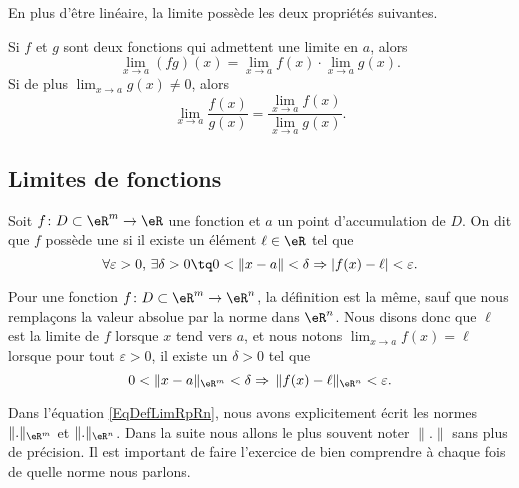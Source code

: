 En plus d'être linéaire, la limite possède les deux propriétés suivantes.
\begin{proposition}
	Si $f$ et $g$ sont deux fonctions qui admettent une limite en $a$, alors
	\begin{equation}
		\lim_{x\to a} (fg)(x)=\lim_{x\to a} f(x)\cdot\lim_{x\to a} g(x).
	\end{equation}
	Si de plus $\lim_{x\to a} g(x)\neq 0$, alors
	\begin{equation}
		\lim_{x\to a} \frac{ f(x) }{ g(x) }=\frac{ \lim_{x\to a} f(x) }{ \lim_{x\to a} g(x) }.
	\end{equation}
\end{proposition}

\subsection{Limites de fonctions}

\begin{definition}\label{def_limite}
	Soit $f\colon D\subset\eR^m\to \eR$ une fonction et $a$ un point d'accumulation de $D$. On dit que $f$ possède une  si il existe un élément $\ell\in\eR$ tel que
	\begin{equation}		\label{Eq2807CondiionLimifnm}
		\forall\varepsilon>0,\,\exists\delta>0\tq 0<\| x-a \|<\delta\Rightarrow | f(x)-\ell |<\varepsilon.
	\end{equation}
	
	Pour une fonction $f\colon D\subset\eR^m\to \eR^n$, la définition est la même, sauf que nous remplaçons la valeur absolue par la norme dans $\eR^n$. Nous disons donc que $\ell$ est la limite de $f$ lorsque $x$ tend vers $a$, et nous notons $\lim_{x\to a} f(x)=\ell$ lorsque pour tout $\varepsilon>0$, il existe un $\delta>0$ tel que
	\begin{equation}		\label{EqDefLimRpRn}
		0<\| x-a \|_{\eR^m}<\delta\Rightarrow\,\| f(x)-\ell \|_{\eR^n}<\varepsilon.
	\end{equation}
\end{definition}

\begin{remark}
	Dans l'équation \eqref{EqDefLimRpRn}, nous avons explicitement écrit les normes $\| . \|_{\eR^m}$ et $\| . \|_{\eR^n}$. Dans la suite nous allons le plus souvent noter $\| . \|$ sans plus de précision. Il est important de faire l'exercice de bien comprendre à chaque fois de quelle norme nous parlons.
\end{remark}


